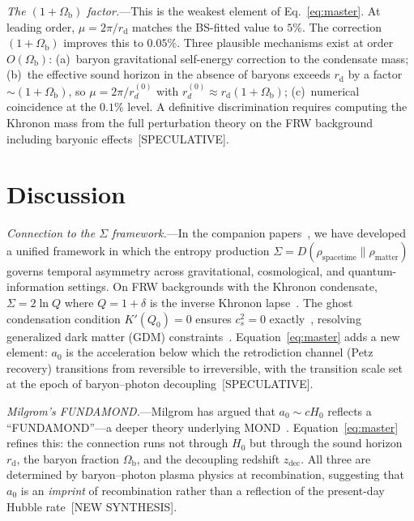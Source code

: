 \documentclass[prl,twocolumn,superscriptaddress,longbibliography]{revtex4-2}
\newcommand{\zdec}{z_{\mathrm{dec}}}
\newcommand{\rd}{r_{\mathrm{d}}}
\newcommand{\Ob}{\Omega_{\mathrm{b}}}
\newcommand{\azero}{a_0}
\begin{document}
\emph{The $(1+\Ob)$ factor.}---This is the weakest
element of Eq.~\eqref{eq:master}.
At leading order, $\mu = 2\pi/\rd$ matches the
BS-fitted value to $5\%$.
The correction $(1+\Ob)$ improves this to $0.05\%$.
Three plausible mechanisms exist at order $O(\Ob)$:
(a)~baryon gravitational self-energy correction to
the condensate mass;
(b)~the effective sound horizon in the absence of
baryons exceeds $\rd$ by a factor ${\sim}(1+\Ob)$,
so $\mu = 2\pi/r_d^{(0)}$ with $r_d^{(0)} \approx
\rd(1+\Ob)$;
(c)~numerical coincidence at the $0.1\%$ level.
A definitive discrimination requires computing the
Khronon mass from the full perturbation theory on the
FRW background including baryonic
effects~[SPECULATIVE].


\section{Discussion}
\label{sec:discussion}

\emph{Connection to the $\Sigma$ framework.}---In the
companion papers~\cite{PaperI,Huang2026_P2,Huang2026_P3},
we have developed a unified framework in which
the entropy production
$\Sigma = D(\rho_{\mathrm{spacetime}} \| \rho_{\mathrm{matter}})$
governs temporal asymmetry across gravitational,
cosmological, and quantum-information settings.
On FRW backgrounds with the Khronon condensate,
$\Sigma = 2\ln Q$ where $Q = 1 + \delta$ is the
inverse Khronon lapse~\cite{Huang2026_P2}.
The ghost condensation condition $K'(Q_0) = 0$ ensures
$c_s^2 = 0$ exactly~\cite{Huang2026_P3}, resolving
generalized dark matter (GDM)
constraints~\cite{Kopp2016}.
Equation~\eqref{eq:master} adds a new element:
$\azero$ is the acceleration below which the
retrodiction channel (Petz recovery) transitions from
reversible to irreversible, with the transition scale
set at the epoch of baryon--photon
decoupling~[SPECULATIVE].

\emph{Milgrom's FUNDAMOND.}---Milgrom has argued
that $\azero \sim cH_0$ reflects a ``FUNDAMOND''---a
deeper theory underlying
MOND~\cite{Milgrom1999,Milgrom2020}.
Equation~\eqref{eq:master} refines this: the
connection runs not through $H_0$ but through the
sound horizon $\rd$, the baryon fraction $\Ob$,
and the decoupling redshift $\zdec$.
All three are determined by baryon--photon plasma
physics at recombination, suggesting that $\azero$ is
an \emph{imprint} of recombination rather than
a reflection of the present-day Hubble
rate~[NEW SYNTHESIS].
\end{document}
